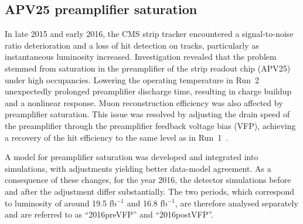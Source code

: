 \begin{subappendices}
\section{APV25 preamplifier saturation}

In late 2015 and early 2016, the CMS strip tracker encountered a signal-to-noise ratio deterioration and a loss of hit detection on tracks, particularly as instantaneous luminosity increased.
Investigation revealed that the problem stemmed from saturation in the preamplifier of the strip readout chip (APV25) under high occupancies.
Lowering the operating temperature in Run~2 unexpectedly prolonged preamplifier discharge time, resulting in charge buildup and a nonlinear response.
Muon reconstruction efficiency was also affected by preamplifier saturation.
This issue was resolved by adjusting the drain speed of the preamplifier \cite{Butz:2018dum} through the preamplifier feedback voltage bias (VFP), achieving a recovery of the hit efficiency to the same level as in Run~1~\cite{CMS-TRK-20-001}.

A model for preamplifier saturation was developed and integrated into simulations, with adjustments yielding better data-model agreement.
As a consequence of these changes, for the year 2016, the detector simulations before and after the adjustment differ substantially.
The two periods, which correspond to luminosity of around 19.5 fb$^{-1}$ and 16.8 fb$^{-1}$,
are therefore analysed separately and are referred to as ``2016preVFP'' and ``2016postVFP''.
\end{subappendices}
